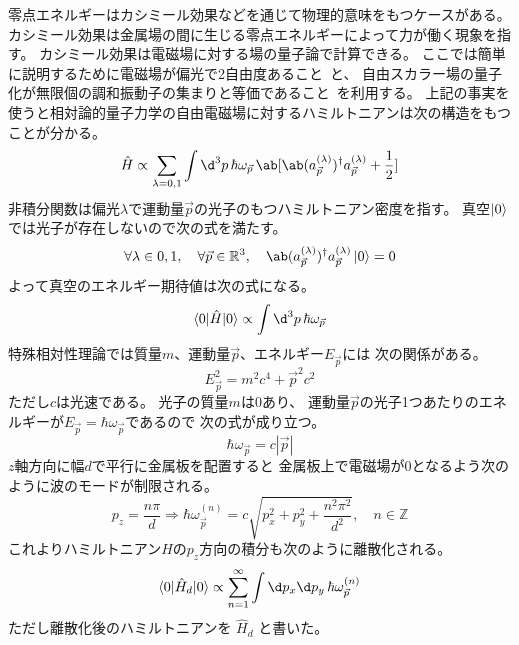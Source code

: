 零点エネルギーはカシミール効果などを通じて物理的意味をもつケースがある。
カシミール効果は金属場の間に生じる零点エネルギーによって力が働く現象を指す。
カシミール効果は電磁場に対する場の量子論で計算できる。
ここでは簡単に説明するために電磁場が偏光で2自由度あること~\cite{mio2012em}と、
自由スカラー場の量子化が無限個の調和振動子の集まりと等価であること~\cite{watamura2024qft}を利用する。
上記の事実を使うと相対論的量子力学の自由電磁場に対するハミルトニアンは次の構造をもつことが分かる。
\begin{equation}
  \hat{H}
  \propto
  \sum_{\lambda=0,1}
  \int\d^3p\,\hbar\omega_{\vec{p}}\,
  \ab[
    \ab(a^{(\lambda)}_{\vec{p}})^\dagger a^{(\lambda)}_{\vec{p}}
    +\frac{1}{2}
  ]
\end{equation}
非積分関数は偏光$\lambda$で運動量$\vec{p}$の光子のもつハミルトニアン密度を指す。
真空$\ket{0}$では光子が存在しないので次の式を満たす。
\begin{equation}
  \forall \lambda\in{0,1},\quad
  \forall \vec{p}\in\mathbb{R}^3,\quad
  \ab(a^{(\lambda)}_{\vec{p}})^\dagger a^{(\lambda)}_{\vec{p}}\ket{0}=0
\end{equation}
よって真空のエネルギー期待値は次の式になる。
\begin{equation}
  \braket{0|\hat{H}|0}
  \propto
  \int\d^3p\,\hbar\omega_{\vec{p}}
\end{equation}
特殊相対性理論では質量$m$、運動量$\vec{p}$、エネルギー$E_{\vec{p}}$には
次の関係がある。
\begin{equation}
  E_{\vec{p}}^2=m^2c^4+\vec{p}^2c^2
\end{equation}
ただし$c$は光速である。
光子の質量$m$は0あり、
運動量$\vec{p}$の光子1つあたりのエネルギーが$E_{\vec{p}}=\hbar\omega_{\vec{p}}$であるので
次の式が成り立つ。
\begin{equation}
  \hbar\omega_{\vec{p}}=c|\vec{p}|
\end{equation}
$z$軸方向に幅$d$で平行に金属板を配置すると
金属板上で電磁場が0となるよう次のように波のモードが制限される。
\begin{equation}
  p_z=\frac{n\pi}{d}
  \Rightarrow
  \hbar\omega^{(n)}_{\vec{p}}
  = c\sqrt{p_x^2+p_y^2+\frac{n^2\pi^2}{d^2}},\quad
  n\in\mathbb{Z}
\end{equation}
これよりハミルトニアン$H$の$p_z$方向の積分も次のように離散化される。
\begin{equation}
  \braket{0|\hat{H}_d|0}
  \propto
  \sum_{n=1}^\infty
  \int\d p_x\d p_y\,\hbar\omega^{(n)}_{\vec{p}}
\end{equation}
ただし離散化後のハミルトニアンを $\hat{H}_d$ と書いた。
